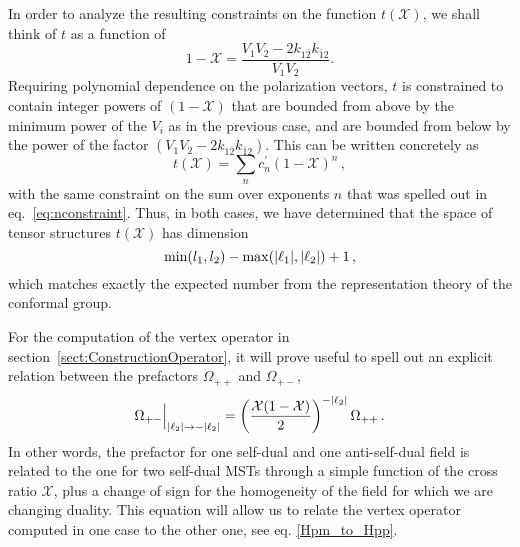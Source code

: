 \documentclass{article}
\def\mK{k}
\begin{document}
In order to analyze the resulting constraints on the function $t(\mathcal{X})$, we 
shall think of $t$ as a function of 
\begin{equation} 
1-\mathcal{X}=\frac{V_1 V_2-2\mK_{1\bar{2}}\mK_{\bar{1}2}}{V_1 V_2} .   
\end{equation} 
Requiring polynomial dependence on the polarization vectors, $t$ is constrained to 
contain integer powers of $(1-\mathcal{X})$ that are bounded from above by the 
minimum power of the $V_i$ as in the previous case, and are bounded from below by
the power of the factor $(V_1V_2-2\mK_{1\bar{2}}\mK_{\bar{1}2})$. This can be written concretely as
\begin{equation}
    t(\mathcal{X})=\sum_n c_n^{\prime} (1-\mathcal{X})^n\,,
\end{equation}
with the same constraint on the sum over exponents $n$ that was spelled out 
in eq.\ \eqref{eq:nconstraint}. Thus, in both cases, we have determined that 
the space of tensor structures $t(\mathcal{X})$ has dimension
\begin{equation}
    \min(l_1,l_2)-\max(\abs{\ell_1},\abs{\ell_2})+1\,,
\end{equation}
which matches exactly the expected number from the representation theory of the
conformal group. 

For the computation of the vertex operator in section~\ref{sect:ConstructionOperator}, it will prove useful to spell out an explicit relation between the prefactors $\Omega_{++}$ and $\Omega_{+-}$, 
\begin{equation}
   \Omega_{+-}\Big|_{\abs{\ell_2}\rightarrow -\abs{\ell_2}} = \left(\frac{\mathcal{X}(1-\mathcal{X})}{2}\right)^{-\abs{\ell_2}}
   \Omega_{++}\,.
    \label{relation_prefactor_sd_asd}
\end{equation}
In other words, the prefactor for one self-dual and one anti-self-dual field is
related to the one for two self-dual MSTs through a simple function of the cross 
ratio $\mathcal{X}$, plus a change of sign for the homogeneity of the field for which we are changing duality. This equation will allow us to relate the vertex operator computed in one case to the other one, see eq. \eqref{Hpm_to_Hpp}.
\end{document}
